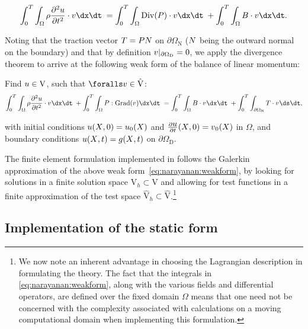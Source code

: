 \begin{equation}
 \int_{0}^{T} \int_{\Omega} \rho \frac{\partial^{2}
    \bu}{\partial t^{2}} \cdot \bv \dx \dt\;
  = \int_{0}^{T}\int_{\Omega} \mathrm{Div}(\bP) \cdot \bv \dx \dt\;
  + \int_{0}^{T} \int_{\Omega} \bB \cdot \bv \dx \dt.
\end{equation}

\noindent Noting that the traction vector $\mbox{$ T$} = \mbox{$ P$} \mbox{$ N$}$ on
$\partial\Omega_{\mathrm{N}}$ ($\mbox{$ N$}$ being the outward normal
on the boundary) and that by definition
$\mbox{$ v$}|_{\partial\Omega_{\mathrm{D}}} = 0$, we apply the divergence
theorem to arrive at the following weak form of the balance of linear
momentum:

\noindent Find $\mbox{$ u$} \in
\mathrm{V}$, such that $\foralls \bv \in \hat{\mathrm{V}}$:
\begin{equation}
  \int_{0}^{T} \int_{\Omega} \rho \frac{\partial^{2} \bu}{\partial
t^{2}} \cdot \bv \dx \dt\; + \int_{0}^{T} \int_{\Omega}
\bP:\mathrm{Grad}(\bv) \dx \dt\; = \int_{0}^{T} \int_{\Omega} \bB
\cdot \bv \dx \dt\; + \int_{0}^{T} \int_{\partial\Omega_{\mathrm{N}}}
\bT \cdot \bv \ds \dt,
\label{eq:narayanan:weakform}
\end{equation}

\noindent with initial conditions $\mbox{$ u$}(\mbox{$ X$}, 0) = \mbox{$ u$}_{0}(\mbox{$ X$})$ and
$\frac{\partial\mbox{$ u$}}{\partial t}(\mbox{$ X$}, 0) = \mbox{$ v$}_{0}(\mbox{$ X$})$ in
$\Omega$, and boundary conditions $\mbox{$ u$}(\mbox{$ X$}, t) = \mbox{$ g$}(\mbox{$ X$}, t)$ on
$\partial\Omega_{\mathrm{D}}$.

The finite element formulation implemented in \twist{} follows the
Galerkin approximation of the above weak
form~\eqref{eq:narayanan:weakform}, by looking for solutions in a finite
solution space  $\mathrm{V}_{h} \subset \mathrm{V}$ and allowing for
test functions in a finite approximation of the test space
$\hat{\mathrm{V}}_{h} \subset \hat{\mathrm{V}}$.\footnote{We now
  note an inherent advantage in choosing the Lagrangian description in
  formulating the theory. The fact that the integrals in
  \eqref{eq:narayanan:weakform}, along with the various fields
  and differential operators, are defined over the fixed domain
  $\Omega$ means that one need not be concerned with the
  complexity associated with calculations on a moving computational
  domain when implementing this formulation.}

\subsection{Implementation of the static form}

